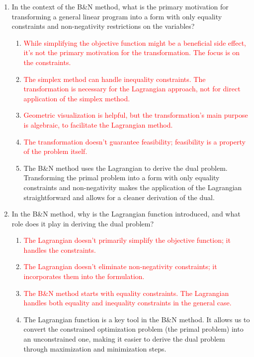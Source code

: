 \documentclass{article}%
\newcommand{\incorrect}[1]{\textcolor{red}{#1}}
\begin{document}
\begin{enumerate}%
\item In the context of the B\&N method, what is the primary motivation for transforming a general linear program into a form with only equality constraints and non-negativity restrictions on the variables?%
\begin{enumerate}%
\item \incorrect{While simplifying the objective function might be a beneficial side effect, it's not the primary motivation for the transformation. The focus is on the constraints.}%
\item \incorrect{The simplex method can handle inequality constraints. The transformation is necessary for the Lagrangian approach, not for direct application of the simplex method.}%
\item \incorrect{Geometric visualization is helpful, but the transformation's main purpose is algebraic, to facilitate the Lagrangian method.}%
\item \incorrect{The transformation doesn't guarantee feasibility; feasibility is a property of the problem itself.}%
\item The B\&N method uses the Lagrangian to derive the dual problem.  Transforming the primal problem into a form with only equality constraints and non-negativity makes the application of the Lagrangian straightforward and allows for a cleaner derivation of the dual.%
\end{enumerate}%
\vspace{1em}%
\item In the B\&N method, why is the Lagrangian function introduced, and what role does it play in deriving the dual problem?%
\begin{enumerate}%
\item \incorrect{The Lagrangian doesn't primarily simplify the objective function; it handles the constraints.}%
\item \incorrect{The Lagrangian doesn't eliminate non-negativity constraints; it incorporates them into the formulation.}%
\item \incorrect{The B\&N method starts with equality constraints. The Lagrangian handles both equality and inequality constraints in the general case.}%
\item The Lagrangian function is a key tool in the B\&N method. It allows us to convert the constrained optimization problem (the primal problem) into an unconstrained one, making it easier to derive the dual problem through maximization and minimization steps.%

\end{enumerate}
\end{enumerate}
\end{document}
